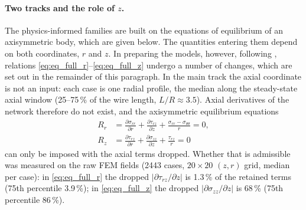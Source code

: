 \paragraph{Two tracks and the role of $z$.}
The physics-informed families are built on the equations of equilibrium of an
axisymmetric body, which are given below. The quantities entering them depend
on both coordinates, $r$ and $z$. In preparing the models, however, following
\cite{TODO-pinn-source-1,TODO-pinn-source-2}, relations
\eqref{eq:eq_full_r}--\eqref{eq:eq_full_z} undergo a number of changes, which
are set out in the remainder of this paragraph.
In the main track the axial coordinate is not an input: each case is one radial
profile, the median along the steady-state axial window (25--75\,\% of the wire
length, $L/R\approx3.5$).
Axial derivatives of the network therefore do not exist, and the axisymmetric
equilibrium equations
\begin{align}
  R_r &= \frac{\partial\sigma_{rr}}{\partial r}
        + \frac{\partial\tau_{rz}}{\partial z}
        + \frac{\sigma_{rr}-\sigma_{\theta\theta}}{r} = 0, \label{eq:eq_full_r}\\
  R_z &= \frac{\partial\tau_{rz}}{\partial r}
        + \frac{\partial\sigma_{zz}}{\partial z}
        + \frac{\tau_{rz}}{r} = 0 \label{eq:eq_full_z}
\end{align}
can only be imposed with the axial terms dropped. Whether that is admissible was
measured on the raw FEM fields (2443 cases, $20\times20$ $(z,r)$ grid, median per
case): in \eqref{eq:eq_full_r} the dropped $|\partial\tau_{rz}/\partial z|$ is
1.3\,\% of the retained terms (75th percentile 3.9\,\%); in \eqref{eq:eq_full_z}
the dropped $|\partial\sigma_{zz}/\partial z|$ is 68\,\% (75th percentile 86\,\%).
